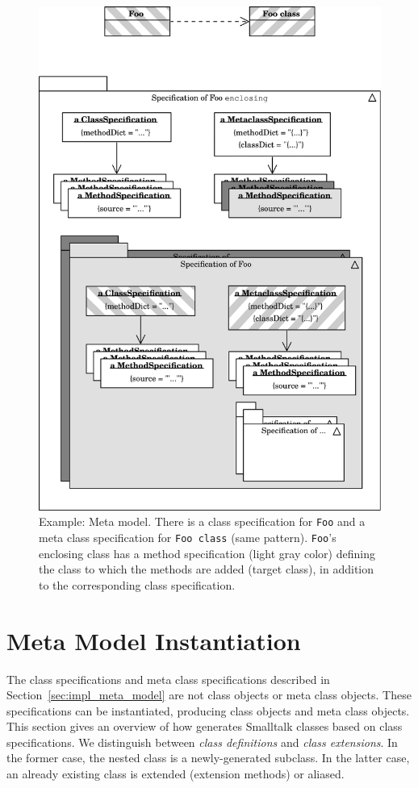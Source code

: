 \begin{figure}[!htp]
	\centering
	\includegraphics[width=\textwidth]{spec_example_r.pdf}
	\caption[Example: Meta model]{Example: Meta model. There is a class specification for \texttt{Foo} and a meta class specification for \texttt{Foo class} (same pattern). \texttt{Foo}'s enclosing class has a method specification (light gray color) defining the class to which the methods are added (target class), in addition to the corresponding class specification.}
	\label{fig:impl_spec_example}
\end{figure}

\section{Meta Model Instantiation}
The class specifications and meta class specifications described in Section~\ref{sec:impl_meta_model} are not class objects or meta class objects. These specifications can be instantiated, producing class objects and meta class objects. This section gives an overview of how \msname generates Smalltalk classes based on class specifications. We distinguish between \emph{class definitions} and \emph{class extensions}. In the former case, the nested class is a newly-generated subclass. In the latter case, an already existing class is extended (extension methods) or aliased. 

